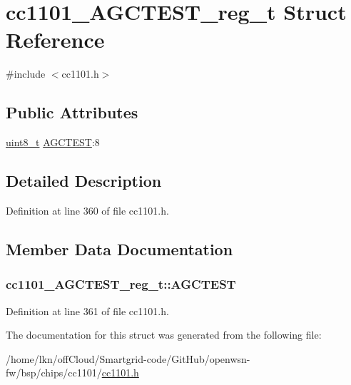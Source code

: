 \hypertarget{structcc1101___a_g_c_t_e_s_t__reg__t}{}\section{cc1101\+\_\+\+A\+G\+C\+T\+E\+S\+T\+\_\+reg\+\_\+t Struct Reference}
\label{structcc1101___a_g_c_t_e_s_t__reg__t}


{\ttfamily \#include $<$cc1101.\+h$>$}

\subsection*{Public Attributes}
\begin{DoxyCompactItemize}
\item 
\hyperlink{_p_e___types_8h_aba7bc1797add20fe3efdf37ced1182c5}{uint8\+\_\+t} \hyperlink{structcc1101___a_g_c_t_e_s_t__reg__t_a1eee62b1c8085e40a05071b6f81e2e0f}{A\+G\+C\+T\+E\+ST}\+:8
\end{DoxyCompactItemize}


\subsection{Detailed Description}


Definition at line 360 of file cc1101.\+h.



\subsection{Member Data Documentation}
\subsubsection[{\texorpdfstring{A\+G\+C\+T\+E\+ST}{AGCTEST}}]{ cc1101\+\_\+\+A\+G\+C\+T\+E\+S\+T\+\_\+reg\+\_\+t\+::\+A\+G\+C\+T\+E\+ST}\hypertarget{structcc1101___a_g_c_t_e_s_t__reg__t_a1eee62b1c8085e40a05071b6f81e2e0f}{}\label{structcc1101___a_g_c_t_e_s_t__reg__t_a1eee62b1c8085e40a05071b6f81e2e0f}


Definition at line 361 of file cc1101.\+h.



The documentation for this struct was generated from the following file\+:\begin{DoxyCompactItemize}
\item 
/home/lkn/off\+Cloud/\+Smartgrid-\/code/\+Git\+Hub/openwsn-\/fw/bsp/chips/cc1101/\hyperlink{cc1101_8h}{cc1101.\+h}\end{DoxyCompactItemize}
